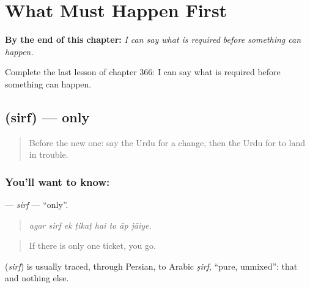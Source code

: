 
\chapter{What Must Happen First}
\label{ch:ur-what-must-happen-first}

\begin{chapteropening}
\textbf{By the end of this chapter:} \emph{I can say what is required before something can happen.}

Complete the last lesson of chapter 366: I can say what is required before something can happen.
\end{chapteropening}

\section[\texorpdfstring{\ur{صرف} (sirf)}{صرف (sirf)}]{ (sirf) — only}

\label{lesson:UR-C366-sirf}



\begin{quote}
Before the new one: say the Urdu for a change, then the Urdu for to land in trouble.
\end{quote}

\subsection*{You'll want to know: }
\textbf{} — \emph{sirf} — \textquotedblleft{}only\textquotedblright{}.

\begin{quote}
       
\end{quote}

\begin{quote}
\emph{agar sirf ek ṭikaṭ hai to āp jāiye.}
\end{quote}

\begin{quote}
If there is only one ticket, you go.
\end{quote}

\begin{cousinweb}
\textbf{} (\emph{sirf}) is usually traced, through Persian, to Arabic \emph{ṣirf}, \textquotedblleft{}pure, unmixed\textquotedblright{}: that and nothing else.
\end{cousinweb}

